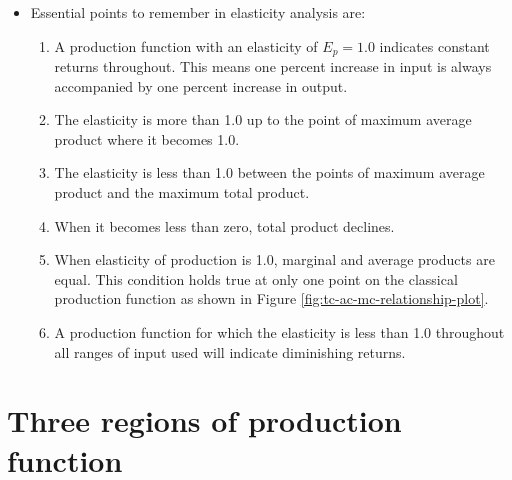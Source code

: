 \documentclass[12pt,ignorenonframetext,aspectratio=169]{beamer}
\providecommand{\tightlist}{%
  \setlength{\itemsep}{0pt}\setlength{\parskip}{0pt}}
\begin{document}
\begin{frame}{}
\protect\hypertarget{section-13}{}
\begin{itemize}
\tightlist
\item
  Essential points to remember in elasticity analysis are:

  \begin{enumerate}
  \tightlist
  \item
    A production function with an elasticity of \(E_p = 1.0\) indicates
    constant returns throughout. This means one percent increase in
    input is always accompanied by one percent increase in output.
  \item
    The elasticity is more than 1.0 up to the point of maximum average
    product where it becomes 1.0.
  \item
    The elasticity is less than 1.0 between the points of maximum
    average product and the maximum total product.
  \item
    When it becomes less than zero, total product declines.
  \item
    When elasticity of production is 1.0, marginal and average products
    are equal. This condition holds true at only one point on the
    classical production function as shown in Figure
    \ref{fig:tc-ac-mc-relationship-plot}.
  \item
    A production function for which the elasticity is less than 1.0
    throughout all ranges of input used will indicate diminishing
    returns.
  \end{enumerate}
\end{itemize}
\end{frame}

\hypertarget{three-regions-of-production-function}{%
\section{Three regions of production
function}\label{three-regions-of-production-function}}
\end{document}
